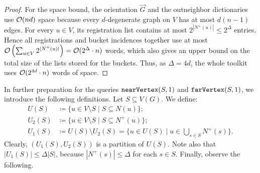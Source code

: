 \begin{proof}
For the space bound, the orientation $\vec G$ and the outneighbor dictionaries use $\mathcal{O}(nd)$ space because every $d$-degenerate graph on $V$ has at most $d(n-1)$ edges.
For every $u\in V$, its registration list contains at most $2^{|N^+(u)|}\le 2^\Delta$ entries.
Hence all registrations and bucket incidences together use at most $\mathcal{O}\left(\sum_{u\in V} 2^{|N^+(u)|}\right)=\mathcal{O}(2^\Delta\cdot n)$ words, which also gives an upper bound on the total size of the lists stored for the buckets. 
Thus, as $\Delta=4d$, the whole toolkit uses $\mathcal{O}(2^{4d}\cdot n)$ words of space.
\end{proof}

In further preparation for the queries $\mathtt{nearVertex}(S,1)$ and $\mathtt{farVertex}(S,1)$, we introduce the following definitions. Let $S\subseteq V(G)$. We define:
\begin{align*}
	U(S)&\coloneqq \{u\in V\setminus S\mid S\subseteq N(u)\};\\
	U_2(S) & \coloneqq \{u\in V\setminus S\mid S\subseteq N^+(u)\};\\
	U_1(S) & \coloneqq U(S)\setminus U_2(S)=\{u\in U(S)\mid u\in \textstyle\bigcup_{s\in S} N^+(s)\}.
\end{align*}
Clearly, $(U_1(S),U_2(S))$ is a partition of $U(S)$.
Note also that $|U_1(S)|\leq \Delta|S|$, because $|N^+(s)|\leq \Delta$ for each $s\in S$.
Finally, observe the following.


